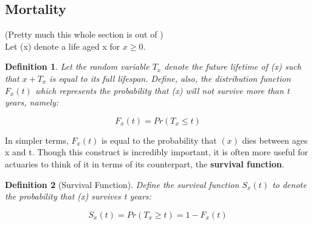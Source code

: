 \documentclass[a4paper]{report}
\newtheorem{definition}{Definition}
\begin{document}
    \subsection{Mortality} 
    \label{mortality}
    (Pretty much this whole section is out of \textcite{actuarial}) 
    \\
    Let (x) denote a life aged x for $x \ge 0$.
    
    \begin{definition}
      Let the random variable $T_x$ denote the future 
      lifetime of (x) such that $x + T_x$ is equal to 
      its full lifespan.
      Define, also, the distribution function $F_x(t)$ 
      which represents the probability that (x) will not 
      survive more than t years, namely:
      
      \begin{equation}
	 F_x(t) = Pr(T_x \le t)
      \end{equation}
    \end{definition}
      
    In simpler terms, $F_x(t)$ is equal to the probability 
    that $(x)$ dies between ages x and t.
    Though this construct is incredibly important, 
    it is often more useful for actuaries to think of it 
    in terms of its counterpart, 
    the \textbf{survival function}.

    \begin{definition}[Survival Function]
      Define the survival function $S_x(t)$ to denote the 
      probability that (x) survives t years:
      
      \begin{equation}
	S_x(t) = Pr(T_x \ge t) = 1 - F_x(t)
      \end{equation}
    \end{definition}
\end{document}

